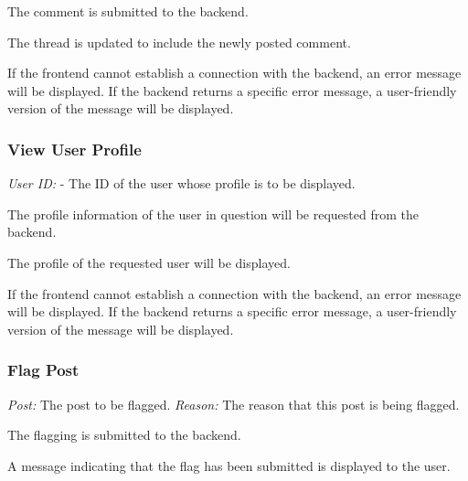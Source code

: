                 The comment is submitted to the backend.

                The thread is updated to include the newly posted comment.

                If the frontend cannot establish a connection with the backend,
                an error message will be displayed. \newline
                If the backend returns a specific error message, a user-friendly
                version of the message will be displayed.

        \subsubsection{View User Profile}
                \textit{User ID:} - The ID of the user whose profile is to be
                                        displayed.

                The profile information of the user in question will be requested from
                the backend.

                The profile of the requested user will be displayed.

                If the frontend cannot establish a connection with the backend,
                an error message will be displayed. \newline
                If the backend returns a specific error message, a user-friendly
                version of the message will be displayed.

        \subsubsection{Flag Post}
                \textit{Post:} The post to be flagged.
                \textit{Reason:} The reason that this post is being flagged.

                The flagging is submitted to the backend. 

                A message indicating that the flag has been submitted is displayed
                to the user.


